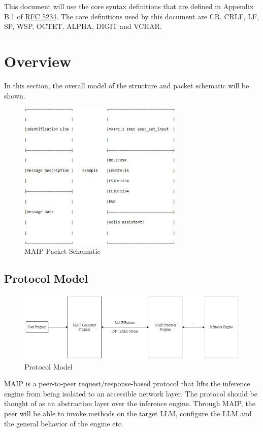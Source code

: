 \documentclass{article}
\begin{document}
This document will use the core syntax definitions that are defined in Appendix B.1 of \underline{RFC 5234}. The core definitions used by this document are CR, CRLF, LF, SP, WSP, OCTET, ALPHA, DIGIT and VCHAR.

\section{Overview}
In this section, the overall model of the structure and packet schematic will be shown.
\begin{figure}[h!]
  \centering
  \includegraphics[width=0.7\textwidth]{packet_schematic.png}
  \caption{MAIP Packet Schematic}
\end{figure}

\subsection{Protocol Model}
\begin{figure}[h!]
  \centering
  \includegraphics[width=1.2\textwidth]{protocol_model.png}
  \caption{Protocol Model}
\end{figure}
MAIP is a peer-to-peer request/response-based protocol that lifts the inference engine from being isolated to an accessible network layer. The protocol should be thought of as an abstraction layer over the inference engine. Through MAIP, the peer will be able to invoke methods on the target LLM, configure the LLM and the general behavior of the engine etc.\newline
\end{document}
